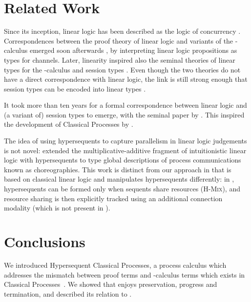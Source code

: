 \documentclass[draft,submission,copyright,creativecommons]{eptcs}
\begin{document}
\section{Related Work}
\label{sec:related-work}

Since its inception, linear logic has been described as the logic of concurrency \citep{girard1987}. Correspondences between the proof theory of linear logic and variants of the \textpi-calculus emerged soon afterwards \citep{abramsky1994,bellin1994}, by interpreting linear logic propositions as types for channels. Later, linearity inspired also the seminal theories of linear types for the \textpi-calculus \citep{kobayashi1999} and session types \citep{honda1998}. Even though the two theories do not have a direct correspondence with linear logic, the link is still strong enough that session types can be encoded into linear types \citep{dardha2017}.

It took more than ten years for a formal correspondence between linear logic and (a variant of) session types to emerge, with the seminal paper by \citet{caires2010}. This inspired the development of Classical Processes by \citet{wadler2012}.

The idea of using hypersequents to capture parallelism in linear logic judgements is not novel: \citet{carbone2018} extended the multiplicative-additive fragment of intuitionistic linear logic with hypersequents to type global descriptions of process communications known as choreographies. This work is distinct from our approach in that \hcp is based on classical linear logic and manipulates hypersequents differently: in \citet{carbone2018}, hypersequents can be formed only when sequents share resources (\cf \textsc{H-Mix}), and resource sharing is then explicitly tracked using an additional connection modality (which is not present in \hcp).

\section{Conclusions}
\label{sec:conclusions}

We introduced Hypersequent Classical Processes, a process calculus which addresses the mismatch between proof terms and \textpi-calculus terms which exists in Classical Processes~\citep{wadler2012}. We showed that \hcp enjoys preservation, progress and termination, and described its relation to \cp.

\clearpage


\end{document}

